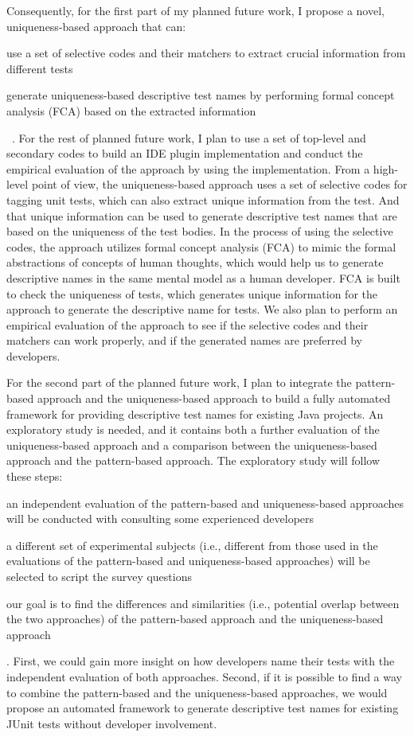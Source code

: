 Consequently, for the first part of my planned future work, I propose a novel, uniqueness-based approach that can:
%
\begin{enumerate*}
\item use a set of selective codes and their matchers to extract crucial information from different tests
\item generate uniqueness-based descriptive test names by performing formal concept analysis (FCA) based on the extracted information
\end{enumerate*}
~\cite{ganter2012formal,emp-study}.
%
For the rest of planned future work, I plan to use a set of top-level and secondary codes to build an IDE plugin implementation and conduct the empirical evaluation of the approach by using the implementation.
%
From a high-level point of view, the uniqueness-based approach uses a set of selective codes for tagging unit tests, which can also extract unique information from the test.
%
And that unique information can be used to generate descriptive test names that are based on the uniqueness of the test bodies.
%
In the process of using the selective codes, the approach utilizes formal concept analysis (FCA) to mimic the formal abstractions of concepts of human thoughts, which would help us to generate descriptive names in the same mental model as a human developer.
%
FCA is built to check the uniqueness of tests, which generates unique information for the approach to generate the descriptive name for tests.
%
We also plan to perform an empirical evaluation of the approach to see if the selective codes and their matchers can work properly, and if the generated names are preferred by developers.


For the second part of the planned future work, I plan to integrate the pattern-based approach and the uniqueness-based approach to build a fully automated framework for providing descriptive test names for existing Java projects.
%
An exploratory study is needed, and it contains both a further evaluation of the uniqueness-based approach and a comparison between the uniqueness-based approach and the pattern-based approach.
%
The exploratory study will follow these steps:
\begin{enumerate*}
\item an independent evaluation of the pattern-based and uniqueness-based approaches will be conducted with consulting some experienced developers
\item a different set of experimental subjects (i.e., different from those used in the evaluations of the pattern-based and uniqueness-based approaches) will be selected to script the survey questions
\item our goal is to find the differences and similarities (i.e., potential overlap between the two approaches) of the pattern-based approach and the uniqueness-based approach 
\end{enumerate*}.
%
First, we could gain more insight on how developers name their tests with the independent evaluation of both approaches.
%
Second, if it is possible to find a way to combine the pattern-based and the uniqueness-based approaches, we would propose an automated framework to generate descriptive test names for existing JUnit tests without developer involvement.
